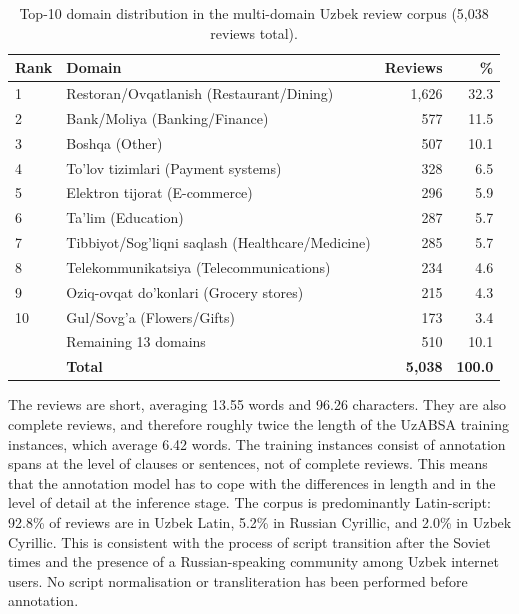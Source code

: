 \documentclass[bdcc,article,submit,moreauthors]{Definitions/mdpi}
\begin{document}
\begin{table}[t]
\centering
\caption{Top-10 domain distribution in the multi-domain Uzbek review corpus (5{,}038 reviews total).}
\label{tab:domain_dist}
\begin{tabular}{llrr}
\toprule
\textbf{Rank} & \textbf{Domain} & \textbf{Reviews} & \textbf{\%} \\
\midrule
1  & Restoran/Ovqatlanish (Restaurant/Dining)              & 1{,}626 & 32.3 \\
2  & Bank/Moliya (Banking/Finance)                         &   577   & 11.5 \\
3  & Boshqa (Other)                                        &   507   & 10.1 \\
4  & To'lov tizimlari (Payment systems)                    &   328   &  6.5 \\
5  & Elektron tijorat (E-commerce)                         &   296   &  5.9 \\
6  & Ta'lim (Education)                                    &   287   &  5.7 \\
7  & Tibbiyot/Sog'liqni saqlash (Healthcare/Medicine)      &   285   &  5.7 \\
8  & Telekommunikatsiya (Telecommunications)               &   234   &  4.6 \\
9  & Oziq-ovqat do'konlari (Grocery stores)                &   215   &  4.3 \\
10 & Gul/Sovg'a (Flowers/Gifts)                            &   173   &  3.4 \\
\midrule
   & Remaining 13 domains                                  &   510   & 10.1 \\
   & \textbf{Total}                                        & \textbf{5{,}038} & \textbf{100.0} \\
\bottomrule
\end{tabular}
\end{table}
The reviews are short, averaging 13.55 words and 96.26 characters. They are also complete reviews, and therefore roughly twice the length of the UzABSA training instances, which average 6.42 words. The training instances consist of annotation spans at the level of clauses or sentences, not of complete reviews. This means that the annotation model has to cope with the differences in length and in the level of detail at the inference stage. The corpus is predominantly Latin-script: 92.8\% of reviews are in Uzbek Latin, 5.2\% in Russian Cyrillic, and 2.0\% in Uzbek Cyrillic. This is consistent with the process of script transition after the Soviet times and the presence of a Russian-speaking community among Uzbek internet users. No script normalisation or transliteration has been performed before annotation.
\end{document}

